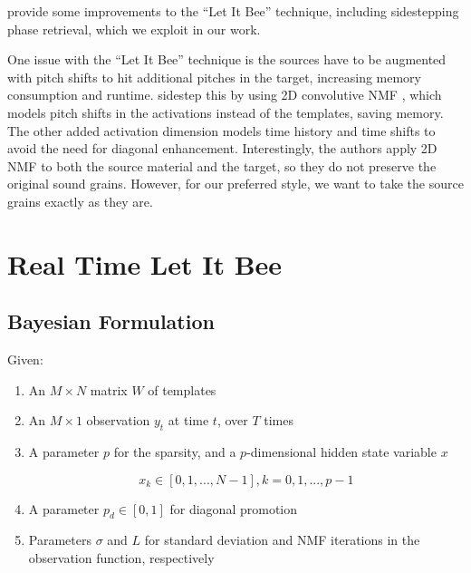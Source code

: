 \documentclass[letterpaper, 12pt]{article}
\begin{document}
\cite{buch2017nichtnegativematrixfaktorisierungnutzendesklangsynthesensystem} provide some improvements to the ``Let It Bee'' technique, including sidestepping phase retrieval, which we exploit in our work.

One issue with the ``Let It Bee'' technique is the sources have to be augmented with pitch shifts to hit additional pitches in the target, increasing memory consumption and runtime.  \cite{foroughmand2017multi, aarabi2018music} sidestep this by using 2D convolutive NMF \cite{schmidt2006nonnegative}, which models pitch shifts in the activations instead of the templates, saving memory.  The other added activation dimension models time history and time shifts to avoid the need for diagonal enhancement.  Interestingly, the authors apply 2D NMF to both the source material and the target, so they do not preserve the original sound grains.  However, for our preferred style, we want to take the source grains exactly as they are.

\section{Real Time Let It Bee}

\subsection{Bayesian Formulation}

    Given:
    \begin{enumerate}
        \item
            An $M \times N$ matrix $W$ of templates
        
        \item
            An $M \times 1$ observation $y_t$ at time $t$, over $T$ times
        
        \item
            A parameter $p$ for the sparsity, and a $p$-dimensional hidden state variable $x$

                \[ x_k \in [0, 1, ..., N-1], k = 0, 1, ..., p-1 \]
        
        \item
            A parameter $p_d \in [0, 1]$ for diagonal promotion
        
        \item
            Parameters $\sigma$ and $L$ for standard deviation and NMF iterations in the observation function, respectively
        
    \end{enumerate}
\end{document}
